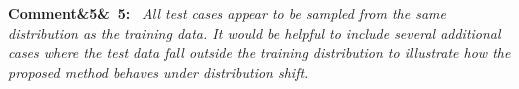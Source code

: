 \documentclass[11pt]{article}
\newenvironment{rcomment}[1]{\par\bigskip\noindent\textbf{Comment\ifx&#1&\else\ #1\fi:}\ \itshape}{\par}
\newenvironment{action}{\par\smallskip\noindent\color{resp}\textbf{Action:}\ }{\par}
\newcommand{\tbd}[1]{\textcolor{note}{\textsf{[#1]}}}
\newcommand{\lines}[1]{\tbd{lines #1}}
\begin{document}
%
%
%
%
\begin{rcomment}{5}
All test cases appear to be sampled from the same distribution as the training data. It would be helpful to include several additional cases where the test data fall outside the training distribution to illustrate how the proposed method behaves under distribution shift.
\end{rcomment}
\end{document}
